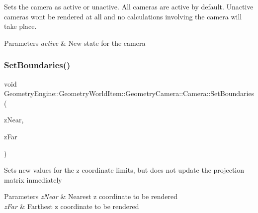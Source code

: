Sets the camera as active or unactive. All cameras are active by default. Unactive cameras won\textquotesingle{}t be rendered at all and no calculations involving the camera will take place. 
\begin{DoxyParams}{Parameters}
{\em active} & New state for the camera \\
\hline
\end{DoxyParams}
\mbox{\label{class_geometry_engine_1_1_geometry_world_item_1_1_geometry_camera_1_1_camera_acf991463c9975a3b0dd047bb73a7dc95}} 
\subsubsection{\texorpdfstring{SetBoundaries()}{SetBoundaries()}}
{\footnotesize\ttfamily void Geometry\+Engine\+::\+Geometry\+World\+Item\+::\+Geometry\+Camera\+::\+Camera\+::\+Set\+Boundaries (\begin{DoxyParamCaption}\item[{G\+Ldouble}]{z\+Near,  }\item[{G\+Ldouble}]{z\+Far }\end{DoxyParamCaption})\hspace{0.3cm}{\ttfamily [virtual]}}

Sets new values for the z coordinate limits, but does not update the projection matrix inmediately 
\begin{DoxyParams}{Parameters}
{\em z\+Near} & Nearest z coordinate to be rendered \\
\hline
{\em z\+Far} & Farthest z coordinate to be rendered \\
\hline
\end{DoxyParams}
\mbox{\label{class_geometry_engine_1_1_geometry_world_item_1_1_geometry_camera_1_1_camera_a4a36e63be866e42068e479bb8eb7c957}} 
